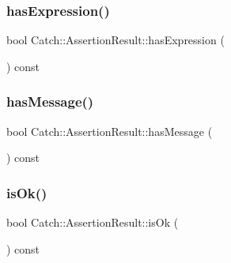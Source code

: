 \hypertarget{class_catch_1_1_assertion_result_aba37b4fef1015989df2136592958e984}{}\label{class_catch_1_1_assertion_result_aba37b4fef1015989df2136592958e984} 
\subsubsection{\texorpdfstring{has\+Expression()}{hasExpression()}}
{\footnotesize\ttfamily bool Catch\+::\+Assertion\+Result\+::has\+Expression (\begin{DoxyParamCaption}{ }\end{DoxyParamCaption}) const}

\hypertarget{class_catch_1_1_assertion_result_aae37064b401919fa8ac480ef86cca924}{}\label{class_catch_1_1_assertion_result_aae37064b401919fa8ac480ef86cca924} 
\subsubsection{\texorpdfstring{has\+Message()}{hasMessage()}}
{\footnotesize\ttfamily bool Catch\+::\+Assertion\+Result\+::has\+Message (\begin{DoxyParamCaption}{ }\end{DoxyParamCaption}) const}

\hypertarget{class_catch_1_1_assertion_result_ae39658b71c4afc3c8a859043b0e97027}{}\label{class_catch_1_1_assertion_result_ae39658b71c4afc3c8a859043b0e97027} 
\subsubsection{\texorpdfstring{is\+Ok()}{isOk()}}
{\footnotesize\ttfamily bool Catch\+::\+Assertion\+Result\+::is\+Ok (\begin{DoxyParamCaption}{ }\end{DoxyParamCaption}) const}

\hypertarget{class_catch_1_1_assertion_result_ac5cc872b721d5fb65d87221d30b22fdd}{}\label{class_catch_1_1_assertion_result_ac5cc872b721d5fb65d87221d30b22fdd} 

